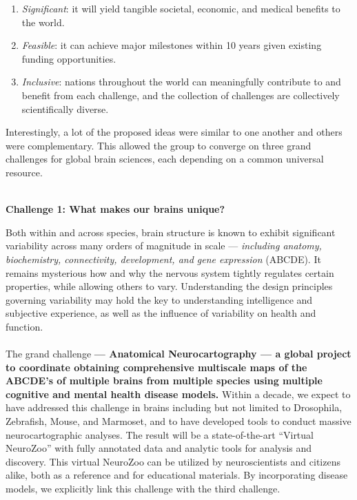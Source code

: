 \documentclass{amsart}
\begin{document}
\begin{enumerate}[1.] 
\item \textit{Significant}: it will yield tangible societal, economic, 
	and medical benefits to the world.

\item \textit{Feasible}: it can achieve major milestones within 10 years 
	given existing funding opportunities.

\item \textit{Inclusive}:  nations throughout the world can meaningfully 
  contribute to and benefit from each challenge, and the collection of 
  challenges are collectively scientifically diverse. \\ 
\end{enumerate}


Interestingly, a lot of the proposed ideas were similar to one another
and others were complementary. This allowed the group to converge on
three grand challenges for global brain sciences, each depending on a
common universal resource. \\ \\


\begin{center}
\large \bf Challenge 1: What makes our brains unique?
\vspace{6pt}
\end{center}


Both within and across species, brain structure is known to exhibit
significant variability across many orders of magnitude in 
scale --- \textit{including anatomy, biochemistry, connectivity, development, and gene
expression} (ABCDE). It remains mysterious how and why the nervous system
tightly regulates certain properties, while allowing others to vary.
Understanding the design principles governing variability may hold the
key to understanding intelligence and subjective experience, as well as
the influence of variability on health and function. \\ \\ 


The grand challenge {\bf --- Anatomical Neurocartography --- a global project to 
  coordinate obtaining comprehensive multiscale maps of the ABCDE’s of 
  multiple brains from multiple species using multiple
  cognitive and mental health disease models.}
Within a decade, we expect to have addressed this challenge in brains
including but not limited to Drosophila, Zebrafish, Mouse, and Marmoset,
and to have developed tools to conduct massive neurocartographic
analyses. The result will be a state-of-the-art ``Virtual NeuroZoo'' with
fully annotated data and analytic tools for analysis and discovery. This
virtual NeuroZoo can be utilized by neuroscientists and citizens alike,
both as a reference and for educational materials. By incorporating
disease models, we explicitly link this challenge with the third
challenge. \\ \\ 
\end{document}
